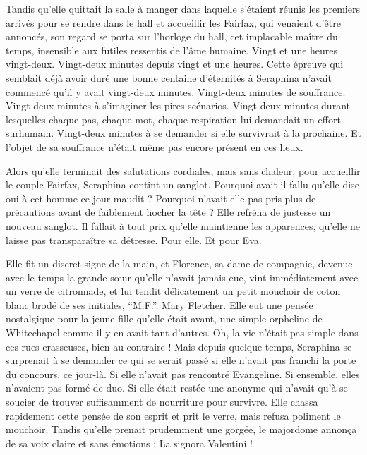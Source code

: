 Tandis qu'elle quittait la salle à manger dans laquelle s’étaient réunis les premiers arrivés pour se rendre dans le hall et accueillir les Fairfax, qui venaient d'être annoncés, son regard se porta sur l'horloge du hall, cet implacable maître du temps, insensible aux futiles ressentis de l'âme humaine.
Vingt et une heures vingt-deux.
Vingt-deux minutes depuis vingt et une heures.
Cette épreuve qui semblait déjà avoir duré une bonne centaine d'éternités à Seraphina n'avait commencé qu'il y avait vingt-deux minutes.
Vingt-deux minutes de souffrance.
Vingt-deux minutes à s'imaginer les pires scénarios.
Vingt-deux minutes durant lesquelles chaque pas, chaque mot, chaque respiration lui demandait un effort surhumain.
Vingt-deux minutes à se demander si elle survivrait à la prochaine.
Et l'objet de sa souffrance n’était même pas encore présent en ces lieux.

Alors qu'elle terminait des salutations cordiales, mais sans chaleur, pour accueillir le couple Fairfax, Seraphina contint un sanglot.
Pourquoi avait-il fallu qu'elle dise oui à cet homme ce jour maudit ?
Pourquoi n'avait-elle pas pris plus de précautions avant de faiblement hocher la tête  ?
Elle refréna de justesse un nouveau sanglot.
Il fallait à tout prix qu'elle maintienne les apparences, qu'elle ne laisse pas transparaître sa détresse.
Pour elle.
Et pour Eva.

Elle fit un discret signe de la main, et Florence, sa dame de compagnie, devenue avec le temps la grande sœur qu'elle n'avait jamais eue, vint immédiatement avec un verre de citronnade, et lui tendit délicatement un petit mouchoir de coton blanc brodé de ses initiales, \enquote{M.F.}.
Mary Fletcher.
Elle eut une pensée nostalgique pour la jeune fille qu'elle était avant, une simple orpheline de Whitechapel comme il y en avait tant d'autres.
Oh, la vie n'était pas simple dans ces rues crasseuses, bien au contraire !
Mais depuis quelque temps, Seraphina se surprenait à se demander ce qui se serait passé si elle n'avait pas franchi la porte du concours, ce jour-là.
Si elle n'avait pas rencontré Evangeline.
Si ensemble, elles n'avaient pas formé de duo.
Si elle était restée une anonyme qui n'avait qu'à se soucier de trouver suffisamment de nourriture pour survivre.
Elle chassa rapidement cette pensée de son esprit et prit le verre, mais refusa poliment le mouchoir.
Tandis qu'elle prenait prudemment une gorgée, le majordome annonça de sa voix claire et sans émotions :
\rep La signora Valentini !

